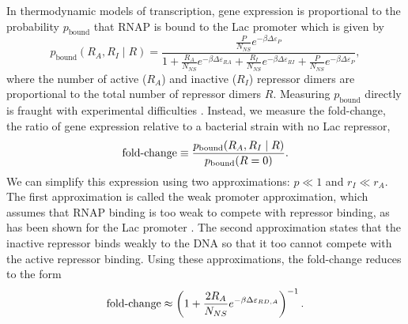 In thermodynamic models of transcription, gene expression is proportional to the
probability $p_{\text{bound}}$ that RNAP is bound to the Lac promoter which is
given by 
\begin{equation}\label{eq2}
p_{\text{bound}}(R_A, R_I \mid R)=\frac{\frac{P}{N_{NS}}e^{-\beta  \Delta\varepsilon_{P}}}{1+\frac{R_A}{N_{NS}}e^{-\beta \Delta\varepsilon_{RA}}+\frac{R_I}{N_{NS}}e^{-\beta  \Delta\varepsilon_{RI}}+\frac{P}{N_{NS}}e^{-\beta  \Delta\varepsilon_{P}}},
\end{equation}
where the number of active ($R_A$) and inactive ($R_I$) repressor dimers are proportional to the total number of repressor dimers $R$.
Measuring $p_{\text{bound}}$ directly is fraught with experimental difficulties \cite{Bintu2005}. Instead, we measure the fold-change, the ratio of gene expression relative to a bacterial strain with no Lac repressor, 
\begin{equation}\label{eq3}
\foldchange\equiv \frac{p_{\text{bound}}(R_A, R_I \mid R)}{p_{\text{bound}}(R = 0)}.%
\end{equation}
We can simplify this expression using two approximations: \(p\ll 1\) and
\(r_I\ll r_A\). The first approximation is called the weak promoter
approximation, which assumes that RNAP binding is too weak to compete with
repressor binding, as has been shown for the Lac promoter \cite{Brewster2012}.
The second approximation states that the inactive repressor binds weakly to the
DNA so that it too cannot compete with the active repressor binding. Using these
approximations, the fold-change reduces to the form 
\begin{equation}\label{eq4}
\operatorname{fold-change} \approx \left(1+\frac{2R_A}{N_{NS}}e^{-\beta  \Delta\varepsilon_{RD,A}}\right)^{-1}.
\end{equation}

